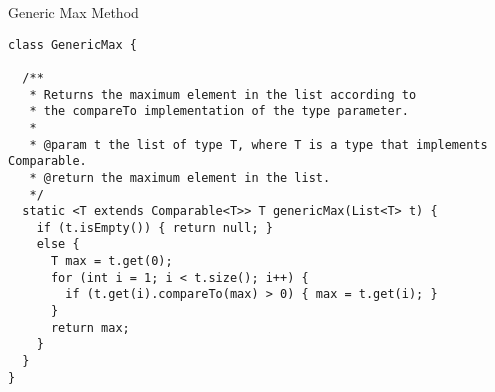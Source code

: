 \begin{cl}{Generic Max Method}
\begin{lstlisting}[language=MyJava]
class GenericMax {
  
  /**
   * Returns the maximum element in the list according to 
   * the compareTo implementation of the type parameter.
   *
   * @param t the list of type T, where T is a type that implements Comparable.
   * @return the maximum element in the list.
   */
  static <T extends Comparable<T>> T genericMax(List<T> t) {
    if (t.isEmpty()) { return null; }
    else {
      T max = t.get(0);
      for (int i = 1; i < t.size(); i++) {
        if (t.get(i).compareTo(max) > 0) { max = t.get(i); }
      }
      return max;
    }
  }
}
\end{lstlisting}
\end{cl}
